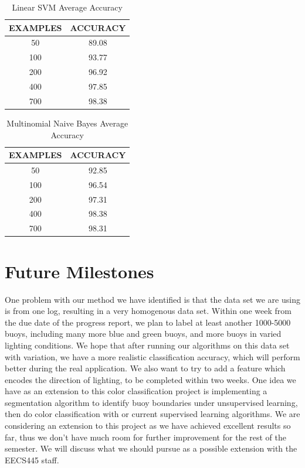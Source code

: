 \documentclass{article} %
\begin{document}
\begin{table}[hp]
\caption{Linear SVM Average Accuracy}
\begin{center}
\begin{tabular}{c|c}
{\bf EXAMPLES}  &{\bf ACCURACY}
\\ \hline
50              &89.08 \\
100             &93.77 \\
200             &96.92 \\
400             &97.85 \\
700             &98.38 \\
\end{tabular}
\end{center}
\end{table}

\begin{table}[hp]
\caption{Multinomial Naive Bayes Average Accuracy}
\begin{center}
\begin{tabular}{c|c}
{\bf EXAMPLES}  &{\bf ACCURACY}
\\ \hline 
50              &92.85 \\
100             &96.54 \\
200             &97.31 \\
400             &98.38 \\
700             &98.31 \\
\end{tabular}
\end{center}
\end{table}

\section{Future Milestones}
One problem with our method we have identified is that the data set we are using is from one log, resulting in a very homogenous data set. Within one week from the due date of the progress report, we plan to label at least another 1000-5000 buoys, including many more blue and green buoys, and more buoys in varied lighting conditions. We hope that after running our algorithms on this data set with variation, we have a more realistic classification accuracy, which will perform better during the real application. We also want to try to add a feature which encodes the direction of lighting, to be completed within two weeks. One idea we have as an extension to this color classification project is implementing a segmentation algorithm to identify buoy boundaries under unsupervised learning, then do color classification with or current supervised learning algorithms. We are considering an extension to this project as we have achieved excellent results so far, thus we don't have much room for further improvement for the rest of the semester. We will discuss what we should pursue as a possible extension with the EECS445 staff. 
 
\end{document}

